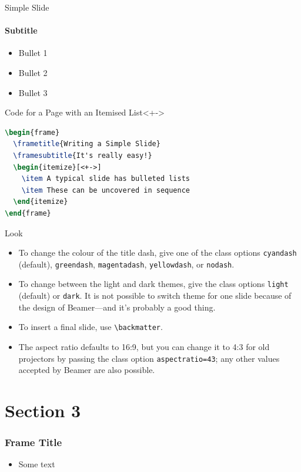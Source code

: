 \documentclass{sintefbeamer}
\begin{document}
\begin{frame}[fragile]{Simple Slide}
\framesubtitle{Subtitle}
\begin{itemize}[<+->]
\item Bullet 1
\item Bullet 2
\item Bullet 3
\end{itemize}
\begin{block}{Code for a Page with an Itemised List}<+->
\begin{lstlisting}[language=TeX]
\begin{frame}
  \frametitle{Writing a Simple Slide}
  \framesubtitle{It's really easy!}
  \begin{itemize}[<+->]
    \item A typical slide has bulleted lists
    \item These can be uncovered in sequence
  \end{itemize}
\end{frame}\end{lstlisting}
\end{block}
\end{frame}

\begin{frame}[fragile]{Look}
\begin{itemize}
\item To change the colour of the title dash, give one of the class options
      \texttt{cyandash} (default), \texttt{greendash}, \texttt{magentadash},
      \texttt{yellowdash}, or \texttt{nodash}.
\item To change between the light and dark themes, give the class options
      \texttt{light} (default) or \texttt{dark}. It is not possible to switch
      theme for one slide because of the design of Beamer---and it's probably a
      good thing.
\item To insert a final slide, use \verb|\backmatter|.
\item The aspect ratio defaults to 16:9, but you can change it to 4:3 for old
      projectors by passing the class option \texttt{aspectratio=43}; any other
      values accepted by Beamer are also possible.
\end{itemize}
\end{frame}

\section{Section 3}

\begin{frame}
\frametitle{Frame Title}
\begin{itemize}
\item Some text
\end{itemize}
\end{frame}

\backmatter
\end{document}
